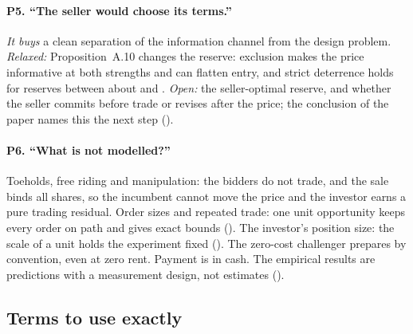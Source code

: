 \paragraph{P5. ``The seller would choose its terms.''}
\emph{It buys} a clean separation of the information channel from the design problem. \emph{Relaxed:}
Proposition~A.10 changes the reserve: exclusion makes the price informative at both strengths and can flatten entry,
and strict deterrence holds for reserves between about  and .
\emph{Open:} the seller-optimal reserve, and whether the seller commits before trade or revises after the price; the
conclusion of the paper names this the next step ().

\paragraph{P6. ``What is not modelled?''}
Toeholds, free riding and manipulation: the bidders do not trade, and the sale binds all shares, so the incumbent
cannot move the price and the investor earns a pure trading residual. Order sizes and repeated trade: one unit
opportunity keeps every order on path and gives exact bounds (). The investor's
position size: the scale of a unit holds the experiment fixed (). The zero-cost
challenger prepares by convention, even at zero rent. Payment is in cash. The empirical results are predictions with
a measurement design, not estimates ().

\subsection{Terms to use exactly}\label{sec:13_panel-terms}

